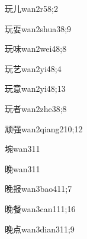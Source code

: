 \begin{verbete}{玩儿}{wan2r5}{8;2}
\end{verbete}

\begin{verbete}{玩耍}{wan2shua3}{8;9}
\end{verbete}

\begin{verbete}{玩味}{wan2wei4}{8;8}
\end{verbete}

\begin{verbete}{玩艺}{wan2yi4}{8;4}
\end{verbete}

\begin{verbete}{玩意}{wan2yi4}{8;13}
\end{verbete}

\begin{verbete}{玩者}{wan2zhe3}{8;8}
\end{verbete}

\begin{verbete}{顽强}{wan2qiang2}{10;12}
\end{verbete}

\begin{verbete}{埦}{wan3}{11}
\end{verbete}

\begin{verbete}{晚}{wan3}{11}
\end{verbete}

\begin{verbete}{晚报}{wan3bao4}{11;7}
\end{verbete}

\begin{verbete}{晚餐}{wan3can1}{11;16}
\end{verbete}

\begin{verbete}{晚点}{wan3dian3}{11;9}
\end{verbete}

